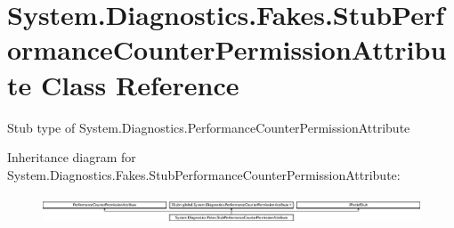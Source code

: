 \hypertarget{class_system_1_1_diagnostics_1_1_fakes_1_1_stub_performance_counter_permission_attribute}{\section{System.\-Diagnostics.\-Fakes.\-Stub\-Performance\-Counter\-Permission\-Attribute Class Reference}
\label{class_system_1_1_diagnostics_1_1_fakes_1_1_stub_performance_counter_permission_attribute}
}


Stub type of System.\-Diagnostics.\-Performance\-Counter\-Permission\-Attribute 


Inheritance diagram for System.\-Diagnostics.\-Fakes.\-Stub\-Performance\-Counter\-Permission\-Attribute\-:\begin{figure}[H]
\begin{center}
\leavevmode
\includegraphics[height=0.831477cm]{class_system_1_1_diagnostics_1_1_fakes_1_1_stub_performance_counter_permission_attribute}
\end{center}
\end{figure}
